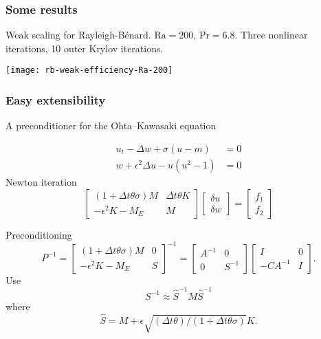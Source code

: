 \documentclass[presentation]{beamer}
\begin{document}
\begin{frame}
  \frametitle{Some results}
  Weak scaling for Rayleigh-B\'enard.  $\text{Ra} = 200$, $\text{Pr} =
  6.8$.  Three nonlinear iterations, 10 outer Krylov iterations.
  \begin{center}
    \texttt{[image: rb-weak-efficiency-Ra-200]}
  \end{center}
\end{frame}

\begin{frame}[allowframebreaks]
  \frametitle{Easy extensibility}
  A preconditioner for the Ohta--Kawasaki
  equation \parencite{Farrell:2016}

  \begin{equation*}
    \begin{split}
      u_t - \Delta w + \sigma(u - m) &= 0\\
      w + \epsilon^2 \Delta u - u(u^2 - 1) &= 0
    \end{split}
  \end{equation*}
  Newton iteration
  \begin{equation*}
    \begin{bmatrix}
      (1 + \Delta t \theta \sigma)M  & \Delta t\theta K \\
      -\epsilon^2 K - M_E & M
    \end{bmatrix}
    \begin{bmatrix}
      \delta u \\
      \delta w
    \end{bmatrix} =
    \begin{bmatrix}
      f_1 \\
      f_2
    \end{bmatrix}
  \end{equation*}

  \pagebreak
  
  Preconditioning
  \begin{equation*}
    P^{-1} = 
    \begin{bmatrix}
      (1 + \Delta t \theta \sigma)M  & 0 \\
      -\epsilon^2 K - M_E & S
    \end{bmatrix}^{-1} =
    \begin{bmatrix}
      A^{-1}  & 0 \\
      0 & S^{-1}
    \end{bmatrix}
    \begin{bmatrix}
      I & 0 \\
      -C A^{-1}  & I
    \end{bmatrix}.
  \end{equation*}
  Use
  \begin{equation*}
    S^{-1} \approx \hat{S}^{-1}M\hat{S}^{-1}
  \end{equation*}
  where
  \begin{equation*}
    \hat{S} = M + \epsilon\sqrt{(\Delta t \theta)/(1+\Delta t \theta\sigma)} K.
  \end{equation*}
\end{frame}
\end{document}

